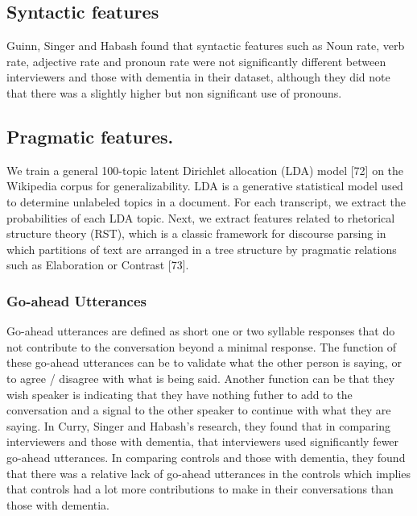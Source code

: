 \subsection{Syntactic features}
Guinn, Singer and Habash \cite{Guinn2015} found that syntactic features such as Noun rate, verb rate, adjective rate and pronoun rate were not significantly different between interviewers and those with dementia in their dataset, although they did note that there was a slightly higher but non significant use of pronouns. 

\subsection{Pragmatic features.} We train a general 100-topic latent Dirichlet allocation (LDA) model [72] on the Wikipedia corpus for generalizability. LDA is a generative statistical model used to determine unlabeled topics in a document. For each transcript, we extract the probabilities of each LDA topic. Next, we extract features related to rhetorical structure theory (RST), which is a classic framework for discourse parsing in which partitions of text are arranged in a tree structure by pragmatic relations such as Elaboration or Contrast [73].

\subsubsection{Go-ahead Utterances}
Go-ahead utterances are defined as short one or two syllable responses that do not contribute to the conversation beyond a minimal response. The function of these go-ahead utterances can be to validate what the other person is saying, or to agree / disagree with what is being said. Another function can be that they wish speaker is indicating that they have nothing futher to add to the conversation and a signal to the other speaker to continue with what they are saying. In Curry, Singer and Habash's research, they found that in comparing interviewers and those with dementia, that interviewers used significantly fewer go-ahead utterances. In comparing controls and those with dementia, they found that there was a relative lack of go-ahead utterances in the controls which implies that controls had a lot more contributions to make in their conversations than those with dementia. 
\par 

 
